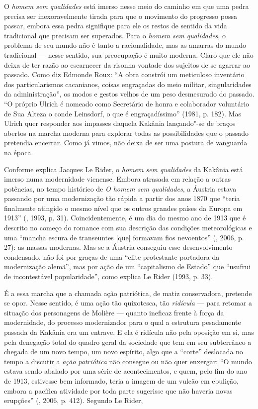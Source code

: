 O \emph{homem sem qualidades} está imerso nesse meio do caminho em que
uma pedra precisa ser inexoravelmente tirada para que o movimento do
progresso possa passar, embora essa pedra signifique para ele os restos
de sentido da vida tradicional que precisam ser superados. Para o
\emph{homem sem qualidades}, o problema de seu mundo não é tanto a
racionalidade, mas as amarras do mundo tradicional --- nesse sentido, sua
preocupação é muito moderna. Claro que ele não deixa de ter razão ao
escarnecer da risonha vontade dos sujeitos de se agarrar ao passado.
Como diz Edmonde Roux: ``A obra constrói um meticuloso inventário dos
particularismos cacanianos, coisas engraçadas do meio militar,
singularidades da administração'', os modos e gestos velhos de um peso
desmesurado do passado. ``O próprio Ulrich é nomeado como Secretário de
honra e colaborador voluntário de Sua Alteza o conde Leinsdorf, o que é
engraçadíssimo'' (1981, p. 182). Mas Ulrich quer responder aos impasses
daquela Kakânia lançando"-se de braços abertos na marcha moderna para
explorar todas as possibilidades que o passado pretendia encerrar. Como
já vimos, não deixa de ser uma postura de vanguarda na época.

Conforme explica Jacques Le Rider, o \emph{homem sem qualidades} da
Kakânia está imerso numa modernidade vienense. Embora atrasada em
relação a outras potências, no tempo histórico de \emph{O homem sem
qualidades}, a Áustria estava passando por uma modernização tão rápida a
partir dos anos 1870 que ``teria finalmente atingido o mesmo nível que
os outros grandes países da Europa em 1913'' (, 1993, p. 31).
Coincidentemente, é um dia do mesmo ano de 1913 que é descrito no começo
do romance com sua descrição das condições meteorológicas e uma ``mancha
escura de transeuntes [que] formavam fios nevoentos'' (, 2006,
p. 27): as massas modernas. Mas se a Áustria conseguiu esse
desenvolvimento condensado, não foi por graças de uma ``elite
protestante portadora da modernização alemã'', mas por ação de um
``capitalismo de Estado'' que ``usufrui de incontestável popularidade'',
como explica Le Rider (1993, p. 33).

É a essa marcha que a chamada ação patriótica, de matiz conservadora,
pretende se opor. Nesse sentido, é uma ação tão quixotesca, tão
\emph{ridícula} --- para retomar a situação dos personagens de Molière ---
quanto ineficaz frente à força da modernidade, do processo modernizador
para o qual a estrutura pesadamente passada da Kakânia era um entrave. E
ela é ridícula não pela oposição em si, mas pela denegação total do
quadro geral da sociedade que tem em seu subterrâneo a chegada de um
novo tempo, um novo espírito, algo que a ``corte'' deslocada no tempo a
discutir a \emph{ação patriótica} não consegue ou não quer enxergar: ``O
mundo estava sendo abalado por uma série de acontecimentos, e quem, pelo
fim do ano de 1913, estivesse bem informado, teria a imagem de um vulcão
em ebulição, embora a pacífica atividade por toda parte sugerisse que
não haveria novas erupções'' (, 2006, p. 412). Segundo Le Rider,

